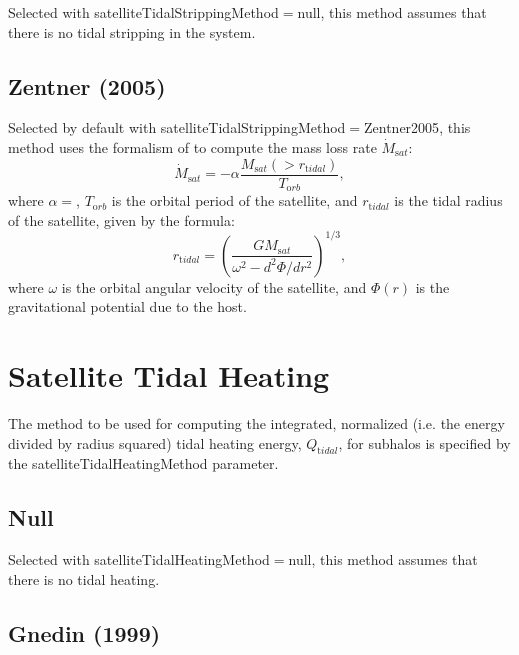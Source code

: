 Selected with {\normalfont \ttfamily satelliteTidalStrippingMethod}$=${\normalfont \ttfamily null}, this method assumes that there is no tidal stripping in the system.

\subsection{Zentner (2005)}

Selected by default with {\normalfont \ttfamily satelliteTidalStrippingMethod}$=${\normalfont \ttfamily Zentner2005}, this method uses the formalism of \cite{zentner_physics_2005} to compute the mass loss rate $\dot{M}_{\mathrm sat}$:
\begin{equation}
\dot{M}_{\mathrm sat}=-\alpha \frac{M_{\mathrm sat}(>r_{\mathrm tidal})}{T_{\mathrm orb}},
\end{equation}
where $\alpha=${\normalfont \ttfamily [satelliteTidalStrippingZentnerRate]}, $T_{\mathrm orb}$ is the orbital period of the satellite, and $r_{\mathrm tidal}$ is the tidal radius of the satellite, given by the \cite{king_structure_1962} formula:
\begin{equation}
r_{\mathrm tidal}=\left(\frac{GM_{\mathrm sat}}{\omega^2-d^2\Phi/dr^2}\right)^{1/3},
\end{equation}
where $\omega$ is the orbital angular velocity of the satellite, and $\Phi(r)$ is the gravitational potential due to the host.

\section{Satellite Tidal Heating} \label{sec:satelliteTidalHeatingMethod}

The method to be used for computing the integrated, normalized (i.e. the energy divided by radius squared) tidal heating energy, $Q_{\mathrm tidal}$, for subhalos is specified by the {\normalfont \ttfamily satelliteTidalHeatingMethod} parameter.

\subsection{Null}

Selected with {\normalfont \ttfamily satelliteTidalHeatingMethod}$=${\normalfont \ttfamily null}, this method assumes that there is no tidal heating.

\subsection{Gnedin (1999)}

